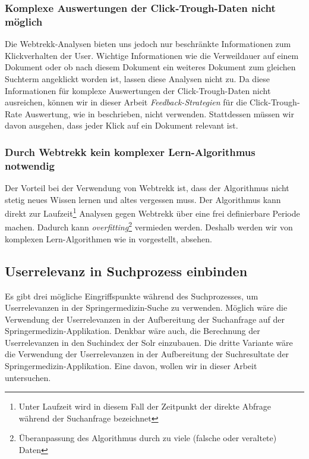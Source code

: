 \subsubsection{Komplexe Auswertungen der Click-Trough-Daten nicht möglich}
\label{sec:Einfuehrung:Methodik:Click-Trough-Daten:Click-Trough-DatenAuswertungen}

Die Webtrekk-Analysen bieten uns jedoch nur beschränkte Informationen zum Klickverhalten der User. Wichtige Informationen wie die Verweildauer auf einem Dokument oder ob nach diesem Dokument ein weiteres Dokument zum gleichen Suchterm angeklickt worden ist, lassen diese Analysen nicht zu. Da diese Informationen für komplexe Auswertungen der Click-Trough-Daten nicht ausreichen, können wir in dieser Arbeit \textit{Feedback-Strategien} für die Click-Trough-Rate Auswertung, wie in \cite{Joachims} beschrieben, nicht verwenden. Stattdessen müssen wir davon ausgehen, dass jeder Klick auf ein Dokument relevant ist.

\subsubsection{Durch Webtrekk kein komplexer Lern-Algorithmus notwendig}
\label{sec:Einfuehrung:Methodik:Click-Trough-Daten:Lern-Algorithmus}

Der Vorteil bei der Verwendung von Webtrekk ist, dass der Algorithmus nicht stetig neues Wissen lernen und altes vergessen muss. Der Algorithmus kann direkt zur Laufzeit\footnote{Unter Laufzeit wird in diesem Fall der Zeitpunkt der direkte Abfrage während der Suchanfrage bezeichnet} Analysen gegen Webtrekk über eine frei definierbare Periode machen. Dadurch kann \textit{overfitting}\footnote{Überanpassung des Algorithmus durch zu viele (falsche oder veraltete) Daten} vermieden werden. Deshalb werden wir von komplexen Lern-Algorithmen wie in \cite{IWUSBI} vorgestellt, absehen.

\subsection{Userrelevanz in Suchprozess einbinden}
\label{sec:Einfuehrung:Methodik:SucheEinbinden}

Es gibt drei mögliche Eingriffspunkte während des Suchprozesses, um Userrelevanzen in der Springermedizin-Suche zu verwenden. Möglich wäre die Verwendung der Userrelevanzen in der Aufbereitung der Suchanfrage auf der Springermedizin-Applikation. Denkbar wäre auch, die Berechnung der Userrelevanzen in den Suchindex der Solr einzubauen. Die dritte Variante wäre die Verwendung der Userrelevanzen in der Aufbereitung der Suchresultate der Springermedizin-Applikation. Eine davon, wollen wir in dieser Arbeit untersuchen. 

